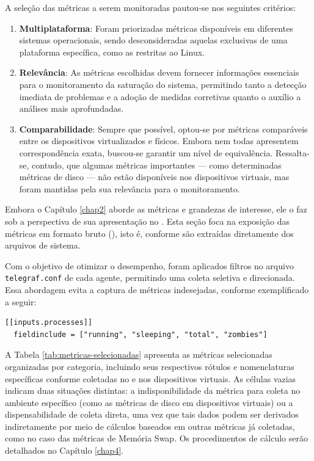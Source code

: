 A seleção das métricas a serem monitoradas pautou-se nos seguintes critérios:
\begin{enumerate}
\item \textbf{Multiplataforma}: Foram priorizadas métricas disponíveis em diferentes sistemas operacionais, sendo desconsideradas aquelas exclusivas de uma plataforma específica, como as restritas ao Linux.
\item \textbf{Relevância}: As métricas escolhidas devem fornecer informações essenciais para o monitoramento da saturação do sistema, permitindo tanto a detecção imediata de problemas e a adoção de medidas corretivas quanto o auxílio a análises mais aprofundadas.
\item \textbf{Comparabilidade}: Sempre que possível, optou-se por métricas comparáveis entre os dispositivos virtualizados e físicos. Embora nem todas apresentem correspondência exata, buscou-se garantir um nível de equivalência. Ressalta-se, contudo, que algumas métricas importantes --- como determinadas métricas de disco --- não estão disponíveis nos dispositivos virtuais, mas foram mantidas pela sua relevância para o monitoramento.
\end{enumerate}

{\color{red}

Embora o Capítulo \ref{chap2} aborde as métricas e grandezas de interesse, ele o faz sob a perspectiva de sua apresentação no . Esta seção foca na exposição das métricas em formato bruto (), isto é, conforme são extraídas diretamente dos arquivos de sistema.

Com o objetivo de otimizar o desempenho, foram aplicados filtros no arquivo \verb|telegraf.conf| de cada agente, permitindo uma coleta seletiva e direcionada. Essa abordagem evita a captura de métricas indesejadas, conforme exemplificado a seguir:

\begin{lstlisting}[caption={Exemplo de filtragem de métricas selecionadas.}, label={lst:exemplo-filtro}]
[[inputs.processes]] 
  fieldinclude = ["running", "sleeping", "total", "zombies"]
\end{lstlisting}

A Tabela \ref{tab:metricas-selecionadas} apresenta as métricas selecionadas organizadas por categoria, incluindo seus respectivos rótulos e nomenclaturas específicas conforme coletadas no  e nos dispositivos virtuais. As células vazias indicam duas situações distintas: a indisponibilidade da métrica para coleta no ambiente específico (como as métricas de disco em dispositivos virtuais) ou a dispensabilidade de coleta direta, uma vez que tais dados podem ser derivados indiretamente por meio de cálculos baseados em outras métricas já coletadas, como no caso das métricas de Memória Swap. Os procedimentos de cálculo serão detalhados no Capítulo \ref{chap4}.
}

